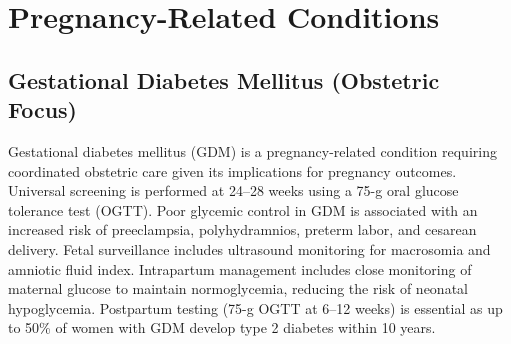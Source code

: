 \section{Pregnancy-Related Conditions}








\label{sec:Pregnancy-Related Conditions}

\subsection{Gestational Diabetes Mellitus (Obstetric Focus)}
\label{sec:obstetric:Gestational Diabetes Mellitus}
Gestational diabetes mellitus (GDM) is a pregnancy-related condition requiring coordinated obstetric care given its implications for pregnancy outcomes. Universal screening is performed at 24--28 weeks using a 75-g oral glucose tolerance test (OGTT). Poor glycemic control in GDM is associated with an increased risk of preeclampsia, polyhydramnios, preterm labor, and cesarean delivery. Fetal surveillance includes ultrasound monitoring for macrosomia and amniotic fluid index. Intrapartum management includes close monitoring of maternal glucose to maintain normoglycemia, reducing the risk of neonatal hypoglycemia. Postpartum testing (75-g OGTT at 6--12 weeks) is essential as up to 50\% of women with GDM develop type 2 diabetes within 10 years.

